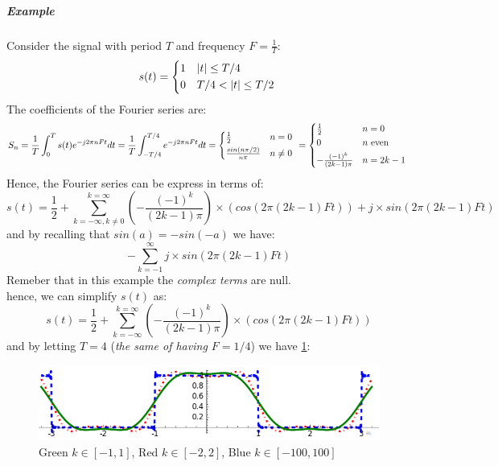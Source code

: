 \documentclass[10pt,a4paper]{report}
\theoremstyle{definition}
\begin{document}
\subparagraph{Example}
\label{fourier-eg2}
Consider the signal with period $T$ and frequency $F = \frac{1}{T}$:
\begin{equation}
	s(t) = 	 \begin{cases*}
		1 & $|t| \leq T/4$ \\
		0  & $T/4 < |t| \leq T/2$
	\end{cases*}
\end{equation}
The coefficients of the Fourier series are:
\begin{equation}
	S_{n} = \frac{1}{T} \int_{0}^{T}s(t)e^{-j2\pi nFt}dt = \frac{1}{T}\int_{-T/4}^{T/4}e^{-j2\pi nFt}dt = \begin{cases*}
		\frac{1}{2} & $n = 0$ \\
		\frac{sin(n\pi /2)}{n\pi}  & $n \neq 0$
	\end{cases*}
	= 	 \begin{cases*}
		\frac{1}{2} & $n = 0$ \\
		0  & $n$ even \\
		-\frac{(-1)^{k}}{(2k-1)\pi} & $n = 2k-1$
	\end{cases*}
\end{equation}
Hence, the Fourier series can be express in terms of:
\begin{equation}
	s(t) = \frac{1}{2} + \sum_{k = - \infty, k \neq 0}^{k = \infty} (-\frac{(-1)^{k}}{(2k-1)\pi}) \times (cos(2\pi (2k-1)Ft)) + j \times sin(2\pi(2k-1)Ft)
\end{equation}
and by recalling that $sin(a) = -sin(-a)$ we have:
\begin{equation}
	- \sum_{k=-1}^{\infty} j \times sin(2\pi (2k-1)Ft)
\end{equation}
Remeber that in this example the \textit{complex terms} are null.\\
hence, we can simplify $s(t)$ as:
\begin{equation}
	s(t) = \frac{1}{2} + \sum_{k = - \infty}^{k = \infty} (-\frac{(-1)^{k}}{(2k-1)\pi}) \times (cos(2\pi (2k-1)Ft))
\end{equation}
and by letting $T = 4$ (\textit{the same of having $F = 1/4$}) we have \ref{fourier-example2}:
\begin{figure}[h]
	\centering\includegraphics[scale=0.50]{images/Pasted image 20230531165143.png}
	\caption{Green $k \in [-1,1]$, Red $k \in [-2,2]$, Blue $k \in [-100,100]$}
	\label{fourier-example2}
	
\end{figure}
\end{document}
